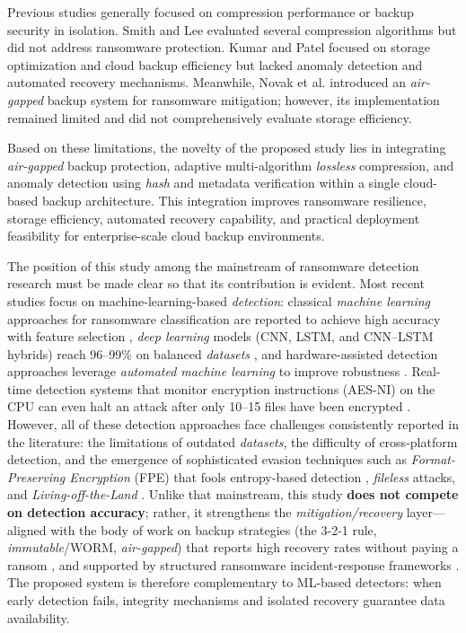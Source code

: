 \documentclass{iaesarticle}
\begin{document}
Previous studies generally focused on compression performance or backup security in isolation. Smith and Lee evaluated several compression algorithms but did not address ransomware protection. Kumar and Patel focused on storage optimization and cloud backup efficiency but lacked anomaly detection and automated recovery mechanisms. Meanwhile, Novak et al. introduced an \textit{air-gapped} backup system for ransomware mitigation; however, its implementation remained limited and did not comprehensively evaluate storage efficiency.

Based on these limitations, the novelty of the proposed study lies in integrating \textit{air-gapped} backup protection, adaptive multi-algorithm \textit{lossless} compression, and anomaly detection using \textit{hash} and metadata verification within a single cloud-based backup architecture. This integration improves ransomware resilience, storage efficiency, automated recovery capability, and practical deployment feasibility for enterprise-scale cloud backup environments.

The position of this study among the mainstream of ransomware detection research must be made clear so that its contribution is evident. Most recent studies focus on machine-learning-based \textit{detection}: classical \textit{machine learning} approaches for ransomware classification are reported to achieve high accuracy with feature selection \cite{31}, \textit{deep learning} models (CNN, LSTM, and CNN--LSTM hybrids) reach 96--99\% on balanced \textit{datasets} \cite{30}, and hardware-assisted detection approaches leverage \textit{automated machine learning} to improve robustness \cite{34}. Real-time detection systems that monitor encryption instructions (AES-NI) on the CPU can even halt an attack after only 10--15 files have been encrypted \cite{32}. However, all of these detection approaches face challenges consistently reported in the literature: the limitations of outdated \textit{datasets}, the difficulty of cross-platform detection, and the emergence of sophisticated evasion techniques such as \textit{Format-Preserving Encryption} (FPE) that fools entropy-based detection \cite{43}, \textit{fileless} attacks, and \textit{Living-off-the-Land} \cite{35}. Unlike that mainstream, this study \textbf{does not compete on detection accuracy}; rather, it strengthens the \textit{mitigation/recovery} layer---aligned with the body of work on backup strategies (the 3-2-1 rule, \textit{immutable}/WORM, \textit{air-gapped}) that reports high recovery rates without paying a ransom \cite{44}, and supported by structured ransomware incident-response frameworks \cite{45}. The proposed system is therefore complementary to ML-based detectors: when early detection fails, integrity mechanisms and isolated recovery guarantee data availability.
\end{document}
